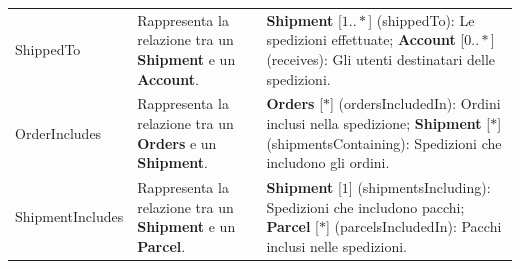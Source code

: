 \begin{tabularx}{\textwidth}{YYY}
  ShippedTo &
  \begin{minipage}[c]{\linewidth}
    \vspace{0.5cm}
    Rappresenta la relazione tra un \textbf{Shipment} e un \textbf{Account}. \newline
  \end{minipage} &
  \begin{minipage}[c]{\linewidth}
    \vspace{0.5cm}
    \textbf{Shipment} [\(1..*\)]  (shippedTo): Le spedizioni effettuate; \newline
    \textbf{Account} [\(0..*\)] (receives): Gli utenti destinatari delle spedizioni. \newline
  \end{minipage} \\

  OrderIncludes &
  \begin{minipage}[c]{\linewidth}
    \vspace{0.5cm}
    Rappresenta la relazione tra un \textbf{Orders} e un \textbf{Shipment}. \newline
  \end{minipage} &
  \begin{minipage}[c]{\linewidth}
    \vspace{0.5cm}
    \textbf{Orders} [\(*\)]  (ordersIncludedIn): Ordini inclusi nella spedizione; \newline
    \textbf{Shipment} [\(*\)] (shipmentsContaining): Spedizioni che includono gli ordini. \newline
  \end{minipage} \\

  ShipmentIncludes &
  \begin{minipage}[c]{\linewidth}
    \vspace{0.5cm}
    Rappresenta la relazione tra un \textbf{Shipment} e un \textbf{Parcel}. \newline
  \end{minipage} &
  \begin{minipage}[c]{\linewidth}
    \vspace{0.5cm}
    \textbf{Shipment} [\(1\)]  (shipmentsIncluding): Spedizioni che includono pacchi; \newline
    \textbf{Parcel} [\(*\)] (parcelsIncludedIn): Pacchi inclusi nelle spedizioni. \newline
  \end{minipage} \\


\end{tabularx}
